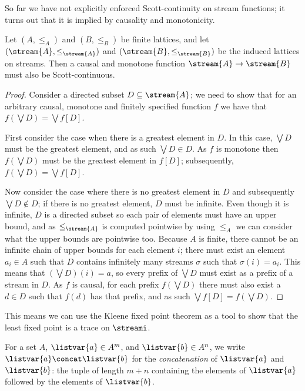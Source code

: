 \documentclass{lmcs}
\begin{document}
So far we have not explicitly enforced Scott-continuity on stream functions; it
turns out that it is implied by causality and monotonicity.

\begin{prop}\label{prop:monotone-causal-scott}
    Let \((A, \leq_A)\) and \((B, \leq_B)\) be finite lattices, and let
    \((\stream{A}, \leq_{\stream{A}})\) and \((\stream{B}, \leq_{\stream{B}})\)
    be the induced lattices on streams.
    Then a causal and monotone function \(\stream{A} \to \stream{B}\) must also
    be Scott-continuous.
\end{prop}
\begin{proof}
    Consider a directed subset \(D \subseteq \stream{A}\); we need to show that
    for an arbitrary causal, monotone and finitely specified function \(f\) we
    have that \(f\left(\bigvee D\right) = \bigvee f[D]\).

    First consider the case when there is a greatest element in \(D\).
    In this case, \(\bigvee D\) must be the greatest element, and as such
    \(\bigvee D \in D\).
    As \(f\) is monotone then \(f(\bigvee D)\) must be the greatest element in
    \(f[D]\); subsequently, \(f\left(\bigvee D\right) = \bigvee f[D]\).

    Now consider the case where there is no greatest element in \(D\) and
    subsequently \(\bigvee D \not\in D\); if there is no greatest element,
    \(D\) must be infinite.
    Even though it is infinite, \(D\) is a directed subset so each pair of
    elements must have an upper bound, and as \(\leq_{\stream{A}}\) is computed
    pointwise by using \(\leq_A\) we can consider what the upper bounds are
    pointwise too.
    Because \(A\) is finite, there cannot be an infinite chain of upper bounds
    for each element \(i\); there must exist an element \(a_i \in A\) such that
    \(D\) contains infinitely many streams \(\sigma\) such that
    \(\sigma(i) = a_i\).
    This means that \(\left(\bigvee D\right)(i) = a\), so every prefix of
    \(\bigvee D\) must exist as a prefix of a stream in \(D\).
    As \(f\) is causal, for each prefix
    \(f\left(\bigvee D\right)\) there must also exist a \(d \in D\) such that
    \(f(d)\) has that prefix, and as such
    \(\bigvee f[D] = f\left(\bigvee D\right)\).
\end{proof}

This means we can use the Kleene fixed point theorem as a tool to show that the
least fixed point is a trace on \(\streami\).

\begin{nota}[Concatenation]
    For a set \(A\), \(\listvar{a} \in A^m\), and \(\listvar{b} \in A^n\), we
    write \(\listvar{a} \concat \listvar{b}\) for the \emph{concatenation}
    of \(\listvar{a}\) and \(\listvar{b}\): the tuple of length \(m+n\)
    containing the elements of \(\listvar{a}\) followed by the elements of
    \(\listvar{b}\).
\end{nota}
\end{document}

